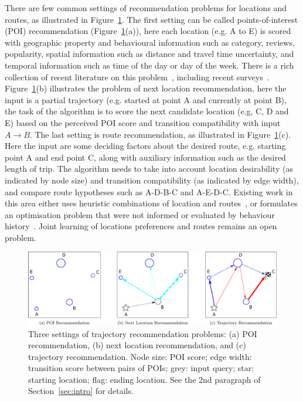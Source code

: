 There are few common settings of recommendation problems for locations and routes, as illustrated in Figure~\ref{fig:threesettings}. 
The first setting can be called points-of-interest (POI) recommendation (Figure~\ref{fig:threesettings}(a)), here each location (e.g. A to E) is scored with geographic property and behavioural information such as category, reviews, popularity, spatial information such as distance and travel time uncertainty, and temporal information such as time of the day or day of the week.  There is a rich collection of recent literature on this problem~\cite{bao2015recommendations,yin2015joint,shi2011personalized,lian2014geomf,liu2014exploiting,yuan2013timeaware,hsieh2014mining,gao2013temporal,yuan2014graph}, including recent surveys~\cite{bao2015recommendations,zheng2014urban}. 
Figure~\ref{fig:threesettings}(b) illustrates the problem of next location recommendation\cite{ijcai13,aaai16,baraglia2013learnext,zhang2015location}, here the input is a partial trajectory (e.g. started at point A and currently at point B), the task of the algorithm is to score the next candidate location (e.g, C, D and E) based on the perceived POI score and transition compatibility with input $A\rightarrow B$. 
    The last setting is route recommendation, as illustrated in Figure~\ref{fig:threesettings}(c). Here the input are some deciding factors about the desired route, e.g. starting point A and end point C, along with auxiliary information such as the desired length of trip. The algorithm needs to take into account location desirability (as indicated by node size) and transition compatibility (as indicated by edge width), and compare route hypotheses such as A-D-B-C and A-E-D-C. Existing work in this area either uses heuristic combinations of location and routes~\cite{ijcai15,lu2012personalized}, or formulates an optimisation problem that were not informed or evaluated by behaviour history~\cite{gioniswsdm14,chen2015tripplanner}. Joint learning of locations preferences and routes remains an open problem.

\begin{figure}[t]
	\centering
	\includegraphics[width=\textwidth]{fig/fig1-flavours.pdf}
	\caption{Three settings of trajectory recommendation problems: (a) POI recommendation, (b) next location recommendation, and (c) trajectory recommendation. Node size: POI score; edge width: transition score between pairs of POIs; grey: input query; star: starting location; flag: ending location. See the 2nd paragraph of Section~\ref{sec:intro} for details.
}
	\label{fig:threesettings}
\end{figure}

